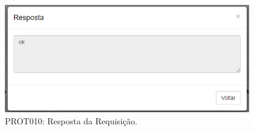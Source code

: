 \begin{anexosenv}
\begin{figure}[htbp]
    \centering
    \includegraphics[width=0.95\textwidth]{figuras/prototipo010.png}
    \caption[PROT010]{PROT010: Resposta da Requisição.}
    \label{PROT010}
\end{figure}

\end{anexosenv}